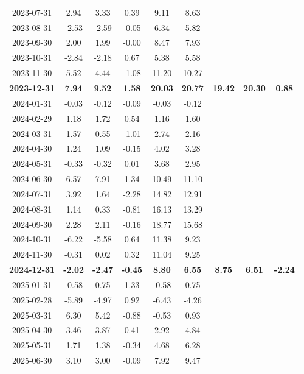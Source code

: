 \begin{longtable}{ccccccccc}
2023-07-31 & 2.94 & 3.33 & 0.39 & 9.11 & 8.63 &  &  &  \\
2023-08-31 & -2.53 & -2.59 & -0.05 & 6.34 & 5.82 &  &  &  \\
2023-09-30 & 2.00 & 1.99 & -0.00 & 8.47 & 7.93 &  &  &  \\
2023-10-31 & -2.84 & -2.18 & 0.67 & 5.38 & 5.58 &  &  &  \\
2023-11-30 & 5.52 & 4.44 & -1.08 & 11.20 & 10.27 &  &  &  \\
\textbf{2023-12-31} & \textbf{7.94} & \textbf{9.52} & \textbf{1.58} & \textbf{20.03} & \textbf{20.77} & \textbf{19.42} & \textbf{20.30} & \textbf{0.88} \\
\midrule
2024-01-31 & -0.03 & -0.12 & -0.09 & -0.03 & -0.12 &  &  &  \\
2024-02-29 & 1.18 & 1.72 & 0.54 & 1.16 & 1.60 &  &  &  \\
2024-03-31 & 1.57 & 0.55 & -1.01 & 2.74 & 2.16 &  &  &  \\
2024-04-30 & 1.24 & 1.09 & -0.15 & 4.02 & 3.28 &  &  &  \\
2024-05-31 & -0.33 & -0.32 & 0.01 & 3.68 & 2.95 &  &  &  \\
2024-06-30 & 6.57 & 7.91 & 1.34 & 10.49 & 11.10 &  &  &  \\
2024-07-31 & 3.92 & 1.64 & -2.28 & 14.82 & 12.91 &  &  &  \\
2024-08-31 & 1.14 & 0.33 & -0.81 & 16.13 & 13.29 &  &  &  \\
2024-09-30 & 2.28 & 2.11 & -0.16 & 18.77 & 15.68 &  &  &  \\
2024-10-31 & -6.22 & -5.58 & 0.64 & 11.38 & 9.23 &  &  &  \\
2024-11-30 & -0.31 & 0.02 & 0.32 & 11.04 & 9.25 &  &  &  \\
\textbf{2024-12-31} & \textbf{-2.02} & \textbf{-2.47} & \textbf{-0.45} & \textbf{8.80} & \textbf{6.55} & \textbf{8.75} & \textbf{6.51} & \textbf{-2.24} \\
\midrule
2025-01-31 & -0.58 & 0.75 & 1.33 & -0.58 & 0.75 &  &  &  \\
2025-02-28 & -5.89 & -4.97 & 0.92 & -6.43 & -4.26 &  &  &  \\
2025-03-31 & 6.30 & 5.42 & -0.88 & -0.53 & 0.93 &  &  &  \\
2025-04-30 & 3.46 & 3.87 & 0.41 & 2.92 & 4.84 &  &  &  \\
2025-05-31 & 1.71 & 1.38 & -0.34 & 4.68 & 6.28 &  &  &  \\
2025-06-30 & 3.10 & 3.00 & -0.09 & 7.92 & 9.47 &  &  &  \\

\end{longtable}
